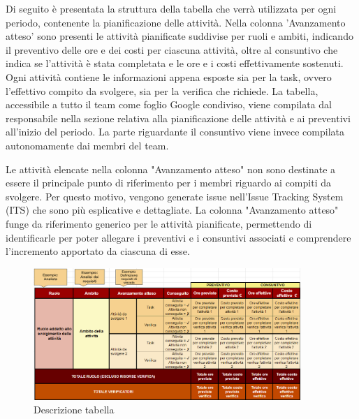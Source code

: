 Di seguito è presentata la struttura della tabella che verrà utilizzata per ogni periodo, contenente la pianificazione delle attività. Nella colonna 'Avanzamento atteso' sono presenti le attività pianificate suddivise per ruoli e ambiti, indicando il preventivo delle ore e dei costi per ciascuna attività, oltre al consuntivo che indica se l'attività è stata completata e le ore e i costi effettivamente sostenuti.
Ogni attività contiene le informazioni appena esposte sia per la task, ovvero l'effettivo compito da svolgere,  sia per la verifica che richiede.
La tabella, accessibile a tutto il team come foglio Google condiviso, viene compilata dal responsabile nella sezione relativa alla pianificazione delle attività e ai preventivi all'inizio del periodo. La parte riguardante il consuntivo viene invece compilata autonomamente dai membri del team.

\vspace{0.5cm}Le attività elencate nella colonna "Avanzamento atteso" non sono destinate a essere il principale punto di riferimento per i membri riguardo ai compiti da svolgere. Per questo motivo, vengono generate issue nell'Issue Tracking System (ITS) che sono più esplicative e dettagliate. La colonna "Avanzamento atteso" funge da riferimento generico per le attività pianificate, permettendo di identificarle per poter allegare i preventivi e i consuntivi associati e comprendere l'incremento apportato da ciascuna di esse.
\begin{figure}[H]
    \centering
    \includegraphics[width=0.9\textwidth]{../Images/spiegazioneTabella.png}
    \caption{Descrizione tabella}
    \label{fig:spiegazioneTabella}
\end{figure}